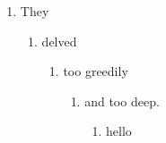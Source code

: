 \documentclass{article}
\begin{document}
\begin{enumerate}
\item They
\begin{enumerate}
\item delved
\begin{enumerate}
\item too greedily
\begin{enumerate}
\item and too deep.
\begin{enumerate}
\item hello
\end{enumerate}
\end{enumerate}
\end{enumerate}
\end{enumerate}
\end{enumerate}
\end{document}
